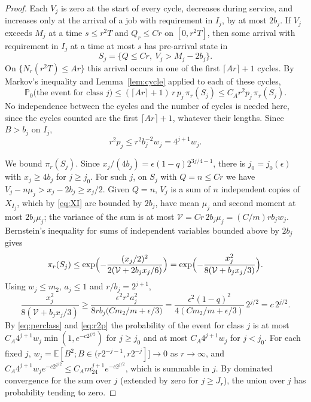 \documentclass[11pt]{amsart}
\theoremstyle{remark}
\numberwithin{equation}{section}
\newcommand{\E}{\mathbb E}
\newcommand{\Pp}{\mathbb P}
\newcommand{\1}{\mathbf 1}
\begin{document}
\begin{proof}
Each $V_j$ is zero at the start of every cycle, decreases during service, and increases only at the arrival of a job with requirement in $I_j$, by at most $2b_j$. If $V_j$ exceeds $M_j$ at a time $s\le r^2T$ and $Q_r\le Cr$ on $[0,r^2T]$, then some arrival with requirement in $I_j$ at a time at most $s$ has pre-arrival state in
\[
S_j=\{Q\le Cr,\ V_j>M_j-2b_j\}.
\]
On $\{N_r(r^2T)\le Ar\}$ this arrival occurs in one of the first $\lceil Ar\rceil+1$ cycles. By Markov's inequality and Lemma~\ref{lem:cycle} applied to each of these cycles,
\begin{equation}\label{eq:perclass}
\Pp_0\bigl(\text{the event for class }j\bigr)\le(\lceil Ar\rceil+1)\,r\,p_j\,\pi_r(S_j)\le C_Ar^2p_j\,\pi_r(S_j).
\end{equation}
No independence between the cycles and the number of cycles is needed here, since the cycles counted are the first $\lceil Ar\rceil+1$, whatever their lengths. Since $B>b_j$ on $I_j$,
\begin{equation}\label{eq:r2p}
r^2p_j\le r^2b_j^{-2}w_j=4^{j+1}w_j .
\end{equation}

We bound $\pi_r(S_j)$. Since $x_j/(4b_j)=\epsilon(1-q)2^{3j/4-1}$, there is $j_0=j_0(\epsilon)$ with $x_j\ge4b_j$ for $j\ge j_0$. For such $j$, on $S_j$ with $Q=n\le Cr$ we have $V_j-n\mu_j>x_j-2b_j\ge x_j/2$. Given $Q=n$, $V_j$ is a sum of $n$ independent copies of $X_{I_j}$, which by \eqref{eq:XI} are bounded by $2b_j$, have mean $\mu_j$ and second moment at most $2b_j\mu_j$; the variance of the sum is at most $\mathcal V=Cr\,2b_j\mu_j=(C/m)rb_jw_j$. Bernstein's inequality for sums of independent variables bounded above by $2b_j$ gives
\[
\pi_r(S_j)\le\exp\Bigl(-\frac{(x_j/2)^2}{2(\mathcal V+2b_jx_j/6)}\Bigr)=\exp\Bigl(-\frac{x_j^2}{8(\mathcal V+b_jx_j/3)}\Bigr).
\]
Using $w_j\le m_2$, $a_j\le1$ and $r/b_j=2^{j+1}$,
\[
\frac{x_j^2}{8(\mathcal V+b_jx_j/3)}\ge\frac{\epsilon^2r^2a_j^2}{8rb_j\bigl(Cm_2/m+\epsilon/3\bigr)}=\frac{\epsilon^2(1-q)^2}{4(Cm_2/m+\epsilon/3)}\,2^{j/2}=c\,2^{j/2}.
\]
By \eqref{eq:perclass} and \eqref{eq:r2p} the probability of the event for class $j$ is at most $C_A4^{j+1}w_j\min(1,e^{-c2^{j/2}})$ for $j\ge j_0$ and at most $C_A4^{j+1}w_j$ for $j<j_0$. For each fixed $j$, $w_j=\E[B^2;B\in(r2^{-j-1},r2^{-j}]]\to0$ as $r\to\infty$, and $C_A4^{j+1}w_j e^{-c2^{j/2}}\le C_Am_24^{j+1}e^{-c2^{j/2}}$, which is summable in $j$. By dominated convergence for the sum over $j$ (extended by zero for $j\ge J_r$), the union over $j$ has probability tending to zero.
\end{proof}
\end{document}
